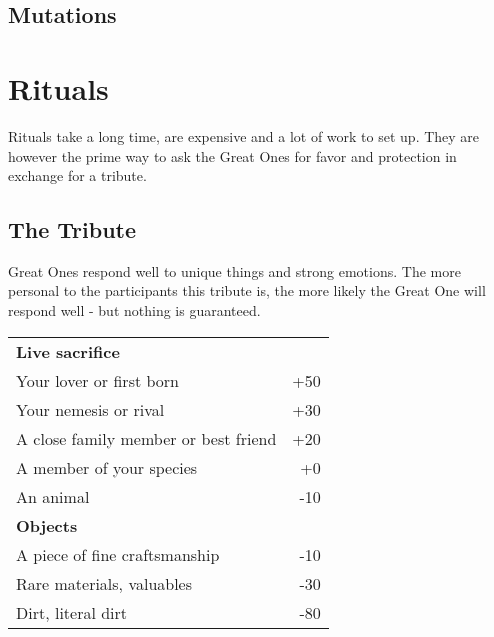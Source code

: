 \documentclass[12pt,a4paper,openany]{book}
\begin{document}
	\section*{Mutations}
	\vspace{4mm}
	\begin{multicols}{2}
	\end{multicols}
	
	\chapter{Rituals}
	\label{ch:rituals}
	Rituals take a long time, are expensive and a lot of work to set up. They are however the prime way to ask the Great Ones for favor and protection in exchange for a tribute.
	\section{The Tribute}
	Great Ones respond well to unique things and strong emotions. The more personal to the participants this tribute is, the more likely the Great One will respond well - but nothing is guaranteed.
	\par
	\begin{center}
	\begin{tabular}{lr}
		\textbf{Live sacrifice} & \\
		Your lover or first born & +50 \\
		Your nemesis or rival & +30 \\
		A close family member or best friend & +20 \\
		A member of your species & +0 \\
		An animal & -10 \\
		\hline
		\textbf{Objects} & \\
		A piece of fine craftsmanship & -10 \\
		Rare materials, valuables & -30 \\
		Dirt, literal dirt & -80
	\end{tabular}
	\end{center}
\end{document}
